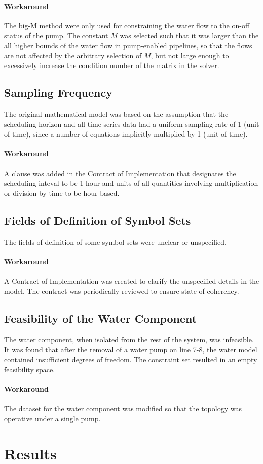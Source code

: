 \documentclass{article}
\begin{document}
\paragraph{Workaround}
The big-M method were only used for constraining the water flow to the on-off
status of the pump. The constant $M$ was selected such that it was larger than
the all higher bounds of the water flow in pump-enabled pipelines, so that the
flows are not affected by the arbitrary selection of $M$, but not large enough
to excessively increase the condition number of the matrix in the solver.


\subsection{Sampling Frequency}
The original mathematical model was based on the assumption that the scheduling
horizon and all time series data had a uniform sampling rate of 1 (unit of
time), since a number of equations implicitly multiplied by 1 (unit of time).

\paragraph{Workaround}
A clause was added in the Contract of Implementation that designates the
scheduling inteval to be 1 hour and units of all quantities involving
multiplication or division by time to be hour-based.


\subsection{Fields of Definition of Symbol Sets}
The fields of definition of some symbol sets were unclear or unspecified.

\paragraph{Workaround}
A Contract of Implementation was created to clarify the unspecified details in
the model. The contract was periodically reviewed to ensure state of coherency.



\subsection{Feasibility of the Water Component}
The water component, when isolated from the rest of the system, was
infeasible. It was found that after the removal of a water pump on line 7-8, the
water model contained insufficient degrees of freedom. The constraint set
resulted in an empty feasibility space.

\paragraph{Workaround}
The dataset for the water component was modified so that the topology was
operative under a single pump.


\section{Results}

\end{document}
